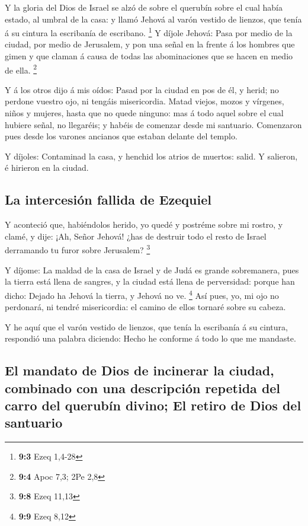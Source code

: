  Y la gloria del Dios de Israel se alzó de sobre el querubín
sobre el cual había estado, al umbral de la casa: y llamó Jehová al
varón vestido de lienzos, que tenía á su cintura la escribanía de
escribano. \footnote{\textbf{9:3} Ezeq 1,4-28}  Y díjole
Jehová: Pasa por medio de la ciudad, por medio de Jerusalem, y pon una
señal en la frente á los hombres que gimen y que claman á causa de todas
las abominaciones que se hacen en medio de ella. \footnote{\textbf{9:4}
  Apoc 7,3; 2Pe 2,8}

 Y á los otros dijo á mis oídos: Pasad por la ciudad en pos
de él, y herid; no perdone vuestro ojo, ni tengáis misericordia.
 Matad viejos, mozos y vírgenes, niños y mujeres, hasta que
no quede ninguno: mas á todo aquel sobre el cual hubiere señal, no
llegaréis; y habéis de comenzar desde mi santuario. Comenzaron pues
desde los varones ancianos que estaban delante del templo.

 Y díjoles: Contaminad la casa, y henchid los atrios de
muertos: salid. Y salieron, é hirieron en la ciudad.

\hypertarget{la-intercesiuxf3n-fallida-de-ezequiel}{%
\subsection{La intercesión fallida de
Ezequiel}\label{la-intercesiuxf3n-fallida-de-ezequiel}}

 Y aconteció que, habiéndolos herido, yo quedé y postréme
sobre mi rostro, y clamé, y dije: ¡Ah, Señor Jehová! ¿has de destruir
todo el resto de Israel derramando tu furor sobre Jerusalem? \footnote{\textbf{9:8}
  Ezeq 11,13}

 Y díjome: La maldad de la casa de Israel y de Judá es
grande sobremanera, pues la tierra está llena de sangres, y la ciudad
está llena de perversidad: porque han dicho: Dejado ha Jehová la tierra,
y Jehová no ve. \footnote{\textbf{9:9} Ezeq 8,12}  Así
pues, yo, mi ojo no perdonará, ni tendré misericordia: el camino de
ellos tornaré sobre su cabeza.

 Y he aquí que el varón vestido de lienzos, que tenía la
escribanía á su cintura, respondió una palabra diciendo: Hecho he
conforme á todo lo que me mandaste.

\hypertarget{el-mandato-de-dios-de-incinerar-la-ciudad-combinado-con-una-descripciuxf3n-repetida-del-carro-del-querubuxedn-divino-el-retiro-de-dios-del-santuario}{%
\subsection{El mandato de Dios de incinerar la ciudad, combinado con una
descripción repetida del carro del querubín divino; El retiro de Dios
del
santuario}\label{el-mandato-de-dios-de-incinerar-la-ciudad-combinado-con-una-descripciuxf3n-repetida-del-carro-del-querubuxedn-divino-el-retiro-de-dios-del-santuario}}

